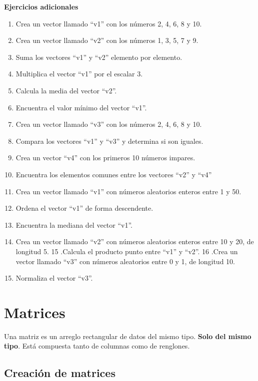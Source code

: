 \documentclass[
]{book}
\providecommand{\tightlist}{%
  \setlength{\itemsep}{0pt}\setlength{\parskip}{0pt}}
\begin{document}
\textbf{Ejercicios adicionales }

\begin{enumerate}
\def\labelenumi{\arabic{enumi}.}
\tightlist
\item
  Crea un vector llamado ``v1'' con los números 2, 4, 6, 8 y 10.
\item
  Crea un vector llamado ``v2'' con los números 1, 3, 5, 7 y 9.
\item
  Suma los vectores ``v1'' y ``v2'' elemento por elemento.
\item
  Multiplica el vector ``v1'' por el escalar 3.
\item
  Calcula la media del vector ``v2''.
\item
  Encuentra el valor mínimo del vector ``v1''.
\item
  Crea un vector llamado ``v3'' con los números 2, 4, 6, 8 y 10.
\item
  Compara los vectores ``v1'' y ``v3'' y determina si son iguales.
\item
  Crea un vector ``v4'' con los primeros 10 números impares.
\item
  Encuentra los elementos comunes entre los vectores ``v2'' y ``v4''
\item
  Crea un vector llamado ``v1'' con números aleatorios enteros entre 1 y 50.
\item
  Ordena el vector ``v1'' de forma descendente.
\item
  Encuentra la mediana del vector ``v1''.
\item
  Crea un vector llamado ``v2'' con números aleatorios enteros entre 10 y 20, de longitud 5.
  15 .Calcula el producto punto entre ``v1'' y ``v2''.
  16 .Crea un vector llamado ``v3'' con números aleatorios entre 0 y 1, de longitud 10.
\item
  Normaliza el vector ``v3''.
\end{enumerate}

\hypertarget{matrices}{%
\chapter{Matrices}\label{matrices}}

Una matriz es un arreglo rectangular de datos del mismo tipo. \textbf{Solo del mismo tipo}. Está compuesta tanto de columnas como de renglones.

\hypertarget{creaciuxf3n-de-matrices}{%
\section{Creación de matrices}\label{creaciuxf3n-de-matrices}}
\end{document}
